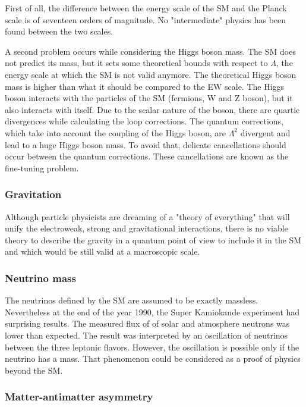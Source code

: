     First of all, the difference between the energy scale of the \gls{SM} and the Planck scale is of seventeen orders of magnitude.
    No "intermediate" physics has been found between the two scales.

    A second problem occurs while considering the Higgs boson mass.
    The \gls{SM} does not predict its mass, but it sets some theoretical bounds with respect to $\Lambda$, the energy scale at which the \gls{SM} is not valid anymore.
    The theoretical Higgs boson mass is higher than what it should be compared to the EW scale.
    The Higgs boson interacts with the particles of the \gls{SM} (fermions, W and Z boson), but it also interacts with itself.
    Due to the scalar nature of the boson, there are quartic divergences while calculating the loop corrections.
    The quantum corrections, which take into account the coupling of the Higgs boson, are $\Lambda^2$ divergent and lead to a huge Higgs boson mass.
    To avoid that, delicate cancellations should occur between the quantum corrections.
    These cancellations are known as the fine-tuning problem. 
    
    \subsubsection{Gravitation}

    Although particle physicists are dreaming of a "theory of everything" that will unify the electroweak, strong and gravitational interactions, there is no viable theory to describe the gravity in a quantum point of view to include it in the \gls{SM} and which would be still valid at a macroscopic scale.

    \subsubsection{Neutrino mass}

    The neutrinos defined by the \gls{SM} are assumed to be exactly massless.
    Nevertheless at the end of the year 1990, the Super Kamiokande experiment had surprising results\cite{Super-Kamiokande-Oscillation}.
    The measured flux of of solar and atmosphere neutrons was lower than expected.
    The result was interpreted by an oscillation of neutrinos between the three leptonic flavors.
    However, the oscillation is possible only if the neutrino has a mass.
    That phenomenon could be considered as a proof of physics beyond the \gls{SM}.

    \subsubsection{Matter-antimatter asymmetry}

